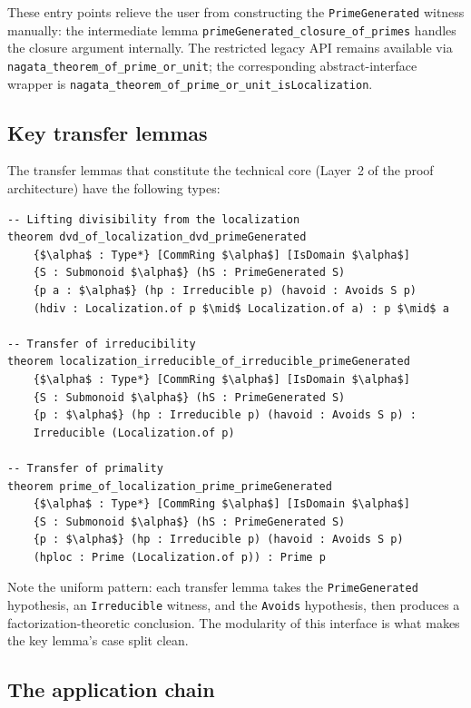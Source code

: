 \documentclass[11pt]{article}
\theoremstyle{plain}
\theoremstyle{definition}
\theoremstyle{remark}
\newcommand{\li}[1]{\texorpdfstring{\texttt{#1}}{#1}}
\begin{document}
\noindent
These entry points relieve the user from constructing the
\li{PrimeGenerated} witness manually: the intermediate lemma
\li{primeGenerated\_closure\_\allowbreak{}of\_primes} handles the closure
argument internally.  The restricted legacy API remains available via
\li{nagata\_theorem\_of\_prime\_\allowbreak{}or\_unit}; the corresponding
abstract-interface wrapper is
\li{nagata\_theorem\_of\_prime\_\allowbreak{}or\_unit\_\allowbreak{}isLocalization}.

\subsection{Key transfer lemmas}

The transfer lemmas that constitute the technical core (Layer~2 of the proof
architecture) have the following types:

\begin{lstlisting}[style=lean]
-- Lifting divisibility from the localization
theorem dvd_of_localization_dvd_primeGenerated
    {$\alpha$ : Type*} [CommRing $\alpha$] [IsDomain $\alpha$]
    {S : Submonoid $\alpha$} (hS : PrimeGenerated S)
    {p a : $\alpha$} (hp : Irreducible p) (havoid : Avoids S p)
    (hdiv : Localization.of p $\mid$ Localization.of a) : p $\mid$ a

-- Transfer of irreducibility
theorem localization_irreducible_of_irreducible_primeGenerated
    {$\alpha$ : Type*} [CommRing $\alpha$] [IsDomain $\alpha$]
    {S : Submonoid $\alpha$} (hS : PrimeGenerated S)
    {p : $\alpha$} (hp : Irreducible p) (havoid : Avoids S p) :
    Irreducible (Localization.of p)

-- Transfer of primality
theorem prime_of_localization_prime_primeGenerated
    {$\alpha$ : Type*} [CommRing $\alpha$] [IsDomain $\alpha$]
    {S : Submonoid $\alpha$} (hS : PrimeGenerated S)
    {p : $\alpha$} (hp : Irreducible p) (havoid : Avoids S p)
    (hploc : Prime (Localization.of p)) : Prime p
\end{lstlisting}

\noindent
Note the uniform pattern: each transfer lemma takes the \li{PrimeGenerated}
hypothesis, an \li{Irreducible} witness, and the \li{Avoids} hypothesis, then
produces a factorization-theoretic conclusion.  The modularity of this
interface is what makes the key lemma's case split clean.

\subsection{The application chain}
\end{document}
